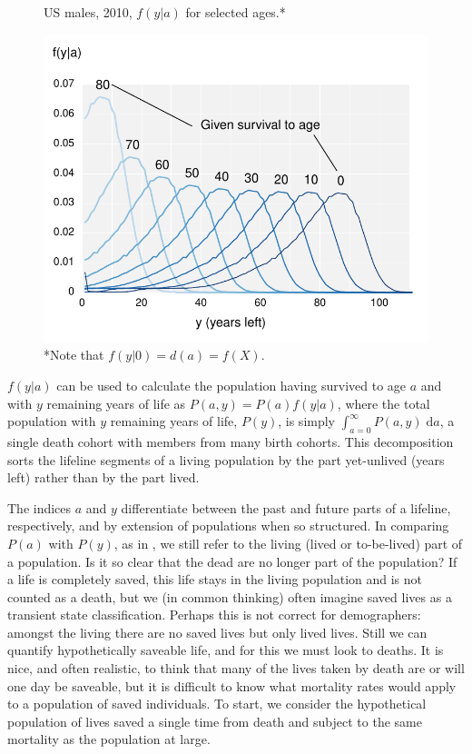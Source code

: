 \documentclass{article}
\newcommand{\dd}{\; \mathrm{d}}
\begin{document}
 \begin{figure}[h]
\centering
	\caption{US males, 2010, $f(y|a)$ for selected ages.*}
	\label{fig:fya}
	\includegraphics[scale=.8]{Figures/fya.pdf}	
	\caption*{*Note that $f(y|0) = d(a) = f(X)$.}
\end{figure}

$f(y|a)$ can be used to calculate the population having survived to age $a$ and
with $y$ remaining years of life as $P(a,y) = P(a)f(y|a)$, where the total
population with $y$ remaining years of life, $P(y)$, is simply $\int
_{a=0}^\infty P(a,y) \dd a$, a single death cohort with members from many birth
cohorts. This decomposition sorts the lifeline segments of a living population
by the part yet-unlived (years left) rather than by the part lived. 

The indices $a$ and $y$ differentiate between the past and future
parts of a lifeline, respectively, and by extension of populations when
so structured.
In comparing $P(a)$ with $P(y)$, as in \citet{brouard1986structure}, we still
refer to the living (lived or to-be-lived) part of a population.
Is it so clear that the dead are no longer part of the population? If a life is
completely saved, this life stays in the living population and is not counted
as a death, but we (in common thinking) often imagine saved lives as a transient
state classification.
Perhaps this is not correct for demographers: amongst the living there
are no saved lives but only lived lives. Still we can quantify
hypothetically saveable life, and for this we must look to deaths.
It is nice, and often realistic, to think that many of the lives taken by death
are or will one day be saveable, but it is difficult to know what mortality
rates would apply to a population of saved individuals. To start, we consider
the hypothetical population of lives saved a single time from death and subject to
the same mortality as the population at large.
\end{document}
